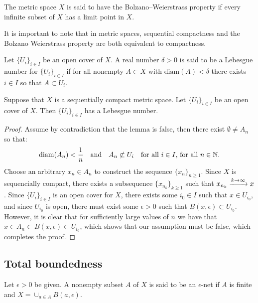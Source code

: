 \documentclass[11pt,a4paper]{article}
\begin{document}
\begin{definition}
  The metric space $X$ is said to have the 
  Bolzano--Weierstrass property if every infinite subset of 
  $X$ has a limit point in $X$.
\end{definition}

It is important to note that in metric spaces, sequential compactness and 
the Bolzano Weierstrass property are both
equivalent to compactness.

\begin{definition}
  Let $\{U_i\}_{i \in I}$ be an open cover of $X$. A real number 
  $\delta > 0$ is said to be a Lebesgue number
  for $\{U_i\}_{i \in I}$
  if for all nonempty $A \subset X$ with $\text{diam}(A) < \delta$
  there exists $i \in I$ so that $A \subset U_i$.
\end{definition}

\begin{lemma}
  Suppose that $X$ is a sequentially compact metric space. 
  Let $\{U_i\}_{i \in I}$ be an open cover of $X$. 
  Then $\{U_i\}_{i \in I}$ has a Lebesgue number.
\end{lemma}
\begin{proof}
  Assume by contradiction that the lemma is false, 
  then there exist $\emptyset \neq A_n$ so that:
  \[
    \operatorname{diam}(A_n) < \frac{1}{n} \quad \text{and} \quad A_n \not\subset U_i 
    \quad\text{for all $i \in I$, for all $n \in \mathbb{N}$}.
  \]
  Choose an arbitrary $x_n \in A_n$ to construct the sequence 
  $\{x_n\}_{n \geq 1}$.
  Since $X$ is sequencially compact, there exists a subsequence
  $\{x_{n_k}\}_{k \geq 1}$ such that $x_{n_k} \xrightarrow{k \to \infty} x$.
  Since $\{U_i\}_{i \in I}$ is an open cover for $X$, there exists
  some $i_0 \in I$ such that $x \in U_{i_0}$, and since $U_{i_0}$ is open,
  there must exist some $\epsilon > 0$ such that 
  $B(x,\epsilon) \subset U_{i_0}$.
  However, it is clear that for sufficiently large values of $n$ we have
  that $x \in A_n \subset B(x,\epsilon) \subset U_{i_0}$, which shows
  that our assumption must be false, which completes the proof.
\end{proof}

\subsection{Total boundedness}

\begin{definition}
  Let $\epsilon > 0$ be given. A nonempty subset $A$ of $X$ is 
  said to be an $\epsilon$-net if $A$ is finite and 
  $X = \cup_{a \in A}{B(a, \epsilon)}$.
\end{definition}
\end{document}
